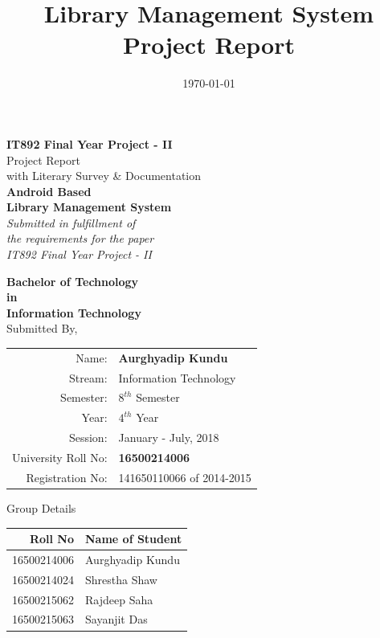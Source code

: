 \documentclass[11pt, a4paper]{thesis}
\date{\today}
\title{Library Management System Project Report}
\begin{document}
\begin{titlepage}

\begin{center}

\textup{\small {\bf IT892 Final Year Project - II} \\ Project Report\\
with Literary Survey \& Documentation}\\[0.2in]

\Large \textbf {Android Based\\Library Management System}\\[0.5in]

       \small \emph{Submitted in fulfillment of\\
        the requirements for the paper\\IT892 Final Year Project - II}
        \vspace{.1in}

       {\bf Bachelor of Technology \\in\\ Information Technology}\\[0.5in]

Submitted By,\\
\begin{table}[h]
\centering
\begin{tabular}{| r | l |}
\hline
Name: & \textbf{Aurghyadip Kundu}\\
Stream: & Information Technology\\ 
Semester: & $8^{th}$ Semester\\
Year: & $4^{th}$ Year\\
Session: & January - July, 2018\\
University Roll No: & \textbf{16500214006}\\
Registration No: & 141650110066 of 2014-2015\\ \hline
\end{tabular}
\end{table}
\normalsize Group Details\\
\begin{table}[h]
\centering
\begin{tabular}{| r | l |}
\hline
\textbf{Roll No} & \textbf{Name of Student} \\ \hline
16500214006 & Aurghyadip Kundu \\
16500214024 & Shrestha Shaw \\ 
16500215062 & Rajdeep Saha \\
16500215063 & Sayanjit Das\\ \hline
\end{tabular}
\end{table}
\vspace{.1in}
\vfill


\end{center}
\end{titlepage}
\end{document}
